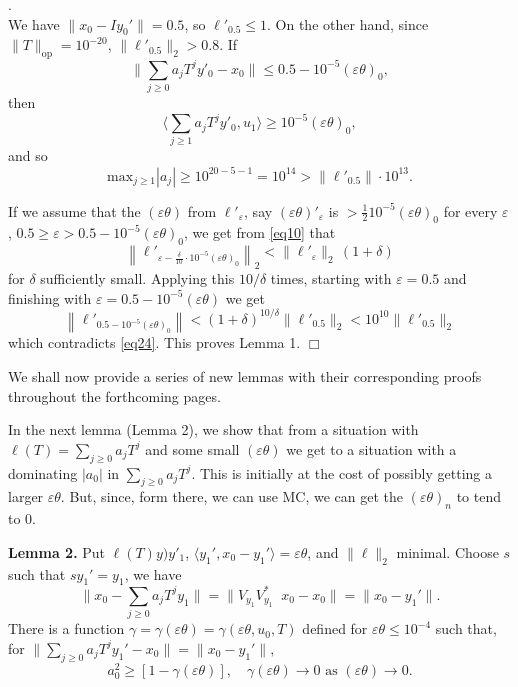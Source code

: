 \documentclass[12pt,oneside,reqno]{amsart}
\theoremstyle{definition}
\DeclareMathOperator*{\VV}{[\,\, ]^{-1}}
\begin{document}
.\\
\noindent We have $\| x_0 - I y_0'\| = 0.5$, so $\ell'_{0.5} \le 1$. On the other hand, since $\|T\|_{\text{op}} = 10^{-20}$, $\|\ell'_{0.5}\|_2 > 0.8$. If 
$$\|\sum_{j \ge 0} a_j T^j y'_0 - x_0 \| \le 0.5 - 10^{-5} (\varepsilon\theta)_0,$$
then
$$\langle \sum_{j \ge 1} a_j T^j y'_0 , u_1 \rangle \ge 10^{-5} (\varepsilon\theta)_0,$$
and so 
\begin{equation}\label{eq24}
\displaystyle \text{max}_{j \ge 1} |a_j| \ge 10^{20-5-1} = 10^{14} > \|\ell'_{0.5}\| \cdot 10^{13}. 
\end{equation}

If we assume that the $(\varepsilon \theta)$ from $\ell'_{\varepsilon}$, say $(\varepsilon \theta)'_{\varepsilon}$ is $ > \frac{1}{2} 10^{-5} (\varepsilon \theta)_0$ for every $\varepsilon$, $0.5 \ge \varepsilon > 0.5 - 10^{-5} (\varepsilon \theta)_0$, we get from \eqref{eq10} that
$$\left\|   \ell'_{\varepsilon - \frac{\delta}{10} \cdot 10^{-5} (\varepsilon \theta)_0}\right\|_2 < \|\ell'_{\varepsilon}\|_2 \, (1 + \delta)$$
for $\delta$ sufficiently small. Applying this $10/\delta$ times, starting with $\varepsilon = 0.5$ and finishing with $\varepsilon = 0.5 - 10^{-5} (\varepsilon \theta)$ we get
$$\left\| \ell'_{0.5 - 10^{-5} (\varepsilon \theta)_0}\right\| < (1+\delta)^{10/\delta} \|\ell'_{0.5}\|_2 < 10^{10} \|\ell'_{0.5}\|_2$$
which contradicts \eqref{eq24}. This proves Lemma 1. \hfill $\Box$

We shall now provide a series of new lemmas with their corresponding proofs throughout the forthcoming pages.

In the next lemma (Lemma 2), we show that from a situation with $\ell (T) = \sum_{j \ge 0} a_j T^j$ and some small $(\varepsilon \theta)$ we get to a situation with a dominating $|a_0|$ in $\sum_{j \ge 0} a_j T^j$. This is initially at the cost of possibly getting a larger $\varepsilon \theta$. But, since, form there, we can use MC, we can get the $(\varepsilon \theta)_n$ to tend to $0$.
\bigskip

\noindent \textbf{Lemma 2.} Put $\ell (T) y ) y'_1$, $\langle y_1', x_0 - y_1' \rangle = \varepsilon\theta$, and $\|\ell\|_2$ minimal. Choose $s$ such that $s y_1' = y_1$, we have
$$\|x_0 - \sum_{j \ge 0} a_j T^j y_1 \| = \|V_{y_1} V^{*}_{y_1} \VV x_0 - x_0 \| = \|x_0 - y_1'\| .$$
There is a function $\gamma = \gamma (\varepsilon \theta) = \gamma (\varepsilon \theta, u_0, T)$ defined for $\varepsilon\theta \le 10^{-4}$ such that, for $\| \sum_{j \ge 0} a_j T^j y_1' - x_0\| =  \|x_0 - y_1'\| ,$ $$a_0^2 \ge \left[ 1 - \gamma (\varepsilon \theta)\right], \quad \gamma(\varepsilon \theta) \rightarrow 0 \text{ as } (\varepsilon \theta) \rightarrow 0.$$
\bigskip
\end{document}
